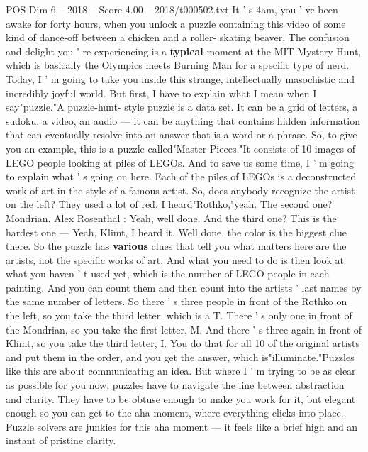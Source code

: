 \begin{textsample}{POS Dim 6 – 2018 – Score 4.00 – 2018/t000502.txt}  \label{ex:f6_pos_062}
It ' s 4am, you ' ve been awake for forty hours, when you unlock a puzzle containing this video of some kind of dance-off between a chicken and a roller- skating beaver.
The confusion and delight you ' re experiencing is a \textbf{typical} moment at the MIT Mystery Hunt, which is basically the Olympics meets Burning Man for a specific type of nerd.
Today, I ' m going to take you inside this strange, intellectually masochistic and incredibly joyful world.
But first, I have to explain what I mean when I say"puzzle."A puzzle-hunt- style puzzle is a data set.
It can be a grid of letters, a sudoku, a video, an audio — it can be anything that contains hidden information that can eventually resolve into an answer that is a word or a phrase.
So, to give you an example, this is a puzzle called"Master Pieces."It consists of 10 images of LEGO people looking at piles of LEGOs.
And to save us some time, I ' m going to explain what ' s going on here.
Each of the piles of LEGOs is a deconstructed work of art in the style of a famous artist.
So, does anybody recognize the artist on the left?
They used a lot of red.
I heard"Rothko,"yeah.
The second one?
Mondrian.
Alex Rosenthal : Yeah, well done.
And the third one?
This is the hardest one — Yeah, Klimt, I heard it.
Well done, the color is the biggest clue there.
So the puzzle has \textbf{various} clues that tell you what matters here are the artists, not the specific works of art.
And what you need to do is then look at what you haven ' t used yet, which is the number of LEGO people in each painting.
And you can count them and then count into the artists ' last names by the same number of letters.
So there ' s three people in front of the Rothko on the left, so you take the third letter, which is a T.
There ' s only one in front of the Mondrian, so you take the first letter, M.
And there ' s three again in front of Klimt, so you take the third letter, I.
You do that for all 10 of the original artists and put them in the order, and you get the answer, which is"illuminate."Puzzles like this are about communicating an idea.
But where I ' m trying to be as clear as possible for you now, puzzles have to navigate the line between abstraction and clarity.
They have to be obtuse enough to make you work for it, but elegant enough so you can get to the aha moment, where everything clicks into place.
Puzzle solvers are junkies for this aha moment — it feels like a brief high and an instant of pristine clarity.

\end{textsample}
